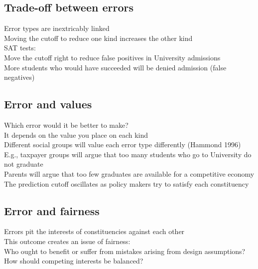 \documentclass{article}
\begin{document}
\subsection*{Trade-off between errors}
\label{sub:trade_off_between_errors}
Error types are inextricably linked\\
Moving the cutoff to reduce one kind increases the other kind\\
SAT tests:\\
Move the cutoff right to reduce false positives in University admissions\\
More students who would have succeeded will be denied admission (false negatives)\\
\subsection*{Error and values}
\label{sub:error_and_values}
Which error would it be better to make?\\
It depends on the value you place on each kind\\
Different social groups will value each error type differently (Hammond 1996)\\
E.g., taxpayer groups will argue that too many students who go to University do not graduate\\
Parents will argue that too few graduates are available for a competitive economy\\
The prediction cutoff oscillates as policy makers try to satisfy each constituency\\
\subsection*{Error and fairness}
\label{sub:error_and_fairness}
Errors pit the interests of constituencies against each other\\
This outcome creates an issue of fairness:\\
Who ought to benefit or suffer from mistakes arising from design assumptions?\\
How should competing interests be balanced?\\
\end{document}
